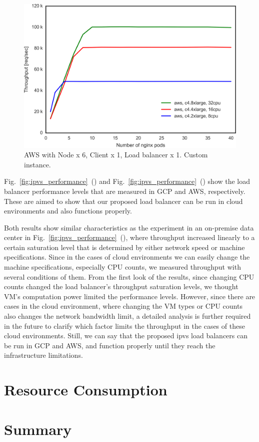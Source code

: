 \begin{figure}[t]
  \centering
  \includegraphics[width=0.8\columnwidth]{Figs/aws_c4_tp}
  \caption{AWS with Node x 6, Client x 1, Load balancer x 1. Custom instance. }
  \label{fig:aws_c4_ieice}
\end{figure}

Fig.~\ref{fig:ipvs_performance}~() and Fig.~\ref{fig:ipvs_performance}~() show the load balancer performance levels that are measured in GCP and AWS, respectively.
These are aimed to show that our proposed load balancer can be run in cloud environments and also functions properly.

Both results show similar characteristics as the experiment in an on-premise data center in Fig.~\ref{fig:ipvs_performance}~(), where throughput increased linearly to a certain saturation level that is determined by either network speed or machine specifications.
Since in the cases of cloud environments we can easily change the machine specifications, especially CPU counts, we measured throughput with several conditions of them.
From the first look of the results, since changing CPU counts changed the load balancer's throughput saturation levels, we thought VM's computation power limited the performance levels.
However, since there are cases in the cloud environment, where changing the VM types or CPU counts also changes the network bandwidth limit, a detailed analysis is further required in the future to clarify which factor limits the throughput in the cases of these cloud environments.
Still, we can say that the proposed ipvs load balancers can be run in GCP and AWS, and function properly until they reach the infrastructure limitations.

\section{Resource Consumption}

\section{Summary}



